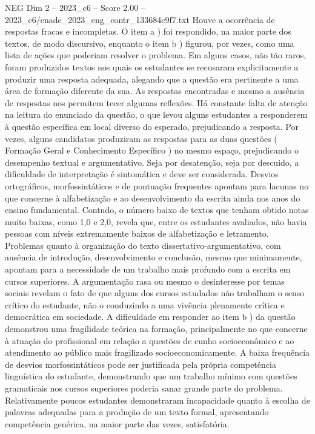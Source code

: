 \begin{textsample}{NEG Dim 2 – 2023\_c6 – Score 2.00 – 2023\_c6/enade\_2023\_eng\_contr\_133684c9f7.txt}
Houve a ocorrência de respostas fracas e incompletas.
O item a ) foi respondido, na maior parte dos textos, de modo discursivo, enquanto o item b ) figurou, por vezes, como uma lista de ações que poderiam resolver o problema.
Em alguns casos, não tão raros, foram produzidos textos nos quais os estudantes se recusaram explicitamente a produzir uma resposta adequada, alegando que a questão era pertinente a uma área de formação diferente da sua.
As respostas encontradas e mesmo a ausência de respostas nos permitem tecer algumas reflexões.
Há constante falta de atenção na leitura do enunciado da questão, o que levou alguns estudantes a responderem à questão específica em local diverso do esperado, prejudicando a resposta.
Por vezes, alguns candidatos produziram as respostas para as duas questões ( Formação Geral e Conhecimento Específico ) no mesmo espaço, prejudicando o desempenho textual e argumentativo.
Seja por desatenção, seja por descuido, a dificuldade de interpretação é sintomática e deve ser considerada.
Desvios ortográficos, morfossintáticos e de pontuação frequentes apontam para lacunas no que concerne à alfabetização e ao desenvolvimento da escrita ainda nos anos do ensino fundamental.
Contudo, o número baixo de textos que tenham obtido notas muito baixas, como 1,0 e 2,0, revela que, entre os estudantes avaliados, não havia pessoas com níveis extremamente baixos de alfabetização e letramento.
Problemas quanto à organização do texto dissertativo-argumentativo, com ausência de introdução, desenvolvimento e conclusão, mesmo que minimamente, apontam para a necessidade de um trabalho mais profundo com a escrita em cursos superiores.
A argumentação rasa ou mesmo o desinteresse por temas sociais revelam o fato de que alguns dos cursos estudados não trabalham o senso crítico do estudante, não o conduzindo a uma vivência plenamente crítica e democrática em sociedade.
A dificuldade em responder ao item b ) da questão demonstrou uma fragilidade teórica na formação, principalmente no que concerne à atuação do profissional em relação a questões de cunho socioeconômico e ao atendimento ao público mais fragilizado socioeconomicamente.
A baixa frequência de desvios morfossintáticos pode ser justificada pela própria competência linguística do estudante, demonstrando que um trabalho mínimo com questões gramaticais nos cursos superiores poderia sanar grande parte do problema.
Relativamente poucos estudantes demonstraram incapacidade quanto à escolha de palavras adequadas para a produção de um texto formal, apresentando competência genérica, na maior parte das vezes, satisfatória.

\end{textsample}
